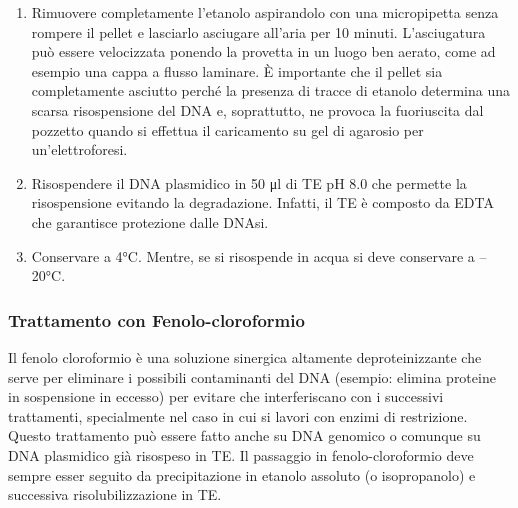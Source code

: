 \begin{enumerate}
  \item Rimuovere completamente l’etanolo aspirandolo con una micropipetta senza rompere il pellet e lasciarlo asciugare
	all’aria per 10 minuti. L’asciugatura può essere velocizzata ponendo la provetta in un luogo ben aerato,
	come ad esempio una cappa a flusso laminare.
	\`E importante che il pellet sia completamente asciutto perché la presenza di tracce di etanolo determina una scarsa
	risospensione del DNA e, soprattutto, ne provoca la fuoriuscita dal pozzetto quando si effettua il caricamento su gel di
	agarosio per un’elettroforesi.

  \item Risospendere il DNA plasmidico in 50 μl di TE pH 8.0 che permette la risospensione evitando la degradazione.
	Infatti, il TE è composto da EDTA che garantisce protezione dalle DNAsi.

  \item Conservare a 4°C. Mentre, se si risospende in acqua si deve conservare a –20°C.

\end{enumerate}

\subsubsection{Trattamento con Fenolo-cloroformio}

Il fenolo cloroformio è una soluzione sinergica altamente deproteinizzante che serve per eliminare i possibili
contaminanti del DNA (esempio: elimina proteine in sospensione in eccesso) per evitare che interferiscano con i
successivi trattamenti, specialmente nel caso in cui si lavori con enzimi di restrizione.
Questo trattamento può essere fatto anche su DNA genomico o comunque su DNA plasmidico già risospeso in TE.
Il passaggio in fenolo-cloroformio deve sempre esser seguito da precipitazione in etanolo assoluto (o isopropanolo)
e successiva risolubilizzazione in TE.

